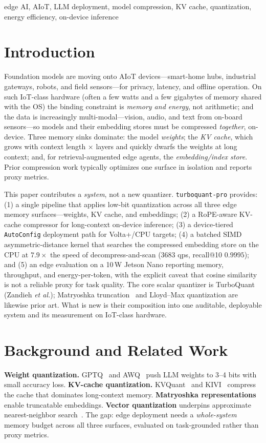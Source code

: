 \documentclass[10pt,conference,compsoc]{IEEEtran}
\begin{document}
\begin{IEEEkeywords}
edge AI, AIoT, LLM deployment, model compression, KV cache, quantization,
energy efficiency, on-device inference
\end{IEEEkeywords}

\section{Introduction}
Foundation models are moving onto AIoT devices---smart-home hubs, industrial
gateways, robots, and field sensors---for privacy, latency, and offline
operation. On such IoT-class hardware (often a few watts and a few gigabytes of
memory shared with the OS) the binding constraint is \emph{memory and energy},
not arithmetic; and the data is increasingly multi-modal---vision, audio, and
text from on-board sensors---so models and their embedding stores must be
compressed \emph{together}, on-device. Three memory sinks dominate: the model
\emph{weights}; the
\emph{KV cache}, which grows with context length $\times$ layers and quickly
dwarfs the weights at long context; and, for retrieval-augmented edge agents,
the \emph{embedding/index store}. Prior compression work typically optimizes one
surface in isolation and reports proxy metrics.

This paper contributes a \emph{system}, not a new quantizer. \texttt{turboquant-pro}
provides: (1) a single pipeline that applies low-bit quantization across all three
edge memory surfaces---weights, KV cache, and embeddings; (2) a RoPE-aware KV-cache
compressor for long-context on-device inference; (3) a device-tiered
\texttt{AutoConfig} deployment path for Volta+/CPU targets; (4) a batched SIMD
asymmetric-distance kernel that searches the compressed embedding store on the CPU
at $7.9\times$ the speed of decompress-and-scan ($3683$ qps, recall@10 $0.9995$);
and (5) an edge
evaluation on a 10\,W Jetson Nano reporting memory, throughput, and
energy-per-token, with the explicit caveat that cosine similarity is not a reliable
proxy for task quality. The core scalar quantizer is TurboQuant~\cite{turboquant}
(Zandieh \emph{et al.}); Matryoshka truncation~\cite{mrl} and Lloyd--Max
quantization are likewise prior art. What is new is their composition into one
auditable, deployable system and its measurement on IoT-class hardware.

\section{Background and Related Work}
\textbf{Weight quantization.} GPTQ~\cite{gptq} and AWQ~\cite{awq} push LLM weights
to 3--4 bits with small accuracy loss. \textbf{KV-cache quantization.}
KVQuant~\cite{kvquant} and KIVI~\cite{kivi} compress the cache that dominates
long-context memory. \textbf{Matryoshka representations}~\cite{mrl} enable
truncatable embeddings. \textbf{Vector quantization} underpins approximate
nearest-neighbor search~\cite{faiss}. The gap: edge deployment needs a
\emph{whole-system} memory budget across all three surfaces, evaluated on
task-grounded rather than proxy metrics.
\end{document}
